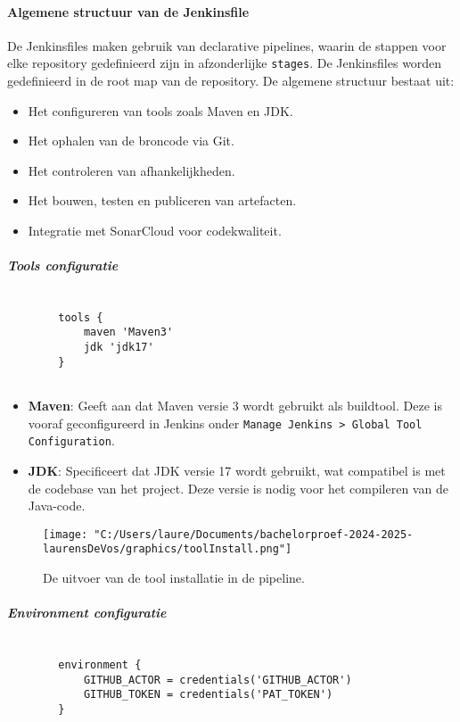 \paragraph{Algemene structuur van de Jenkinsfile}
De Jenkinsfiles maken gebruik van declarative pipelines, waarin de stappen voor elke repository gedefinieerd zijn in afzonderlijke \texttt{stages}. De Jenkinsfiles worden gedefinieerd in de root map van de repository. De algemene structuur bestaat uit:
\begin{itemize}
    \item Het configureren van tools zoals Maven en JDK.
    \item Het ophalen van de broncode via Git.
    \item Het controleren van afhankelijkheden.
    \item Het bouwen, testen en publiceren van artefacten.
    \item Integratie met SonarCloud voor codekwaliteit.
\end{itemize}

\subparagraph{Tools configuratie}
\begin{verbatim}
        
        tools {
            maven 'Maven3'
            jdk 'jdk17'
        }
        

\end{verbatim}

\begin{itemize}
    \item \textbf{Maven}: Geeft aan dat Maven versie 3 wordt gebruikt als buildtool. Deze is vooraf geconfigureerd in Jenkins onder \texttt{Manage Jenkins > Global Tool Configuration}.
    \item \textbf{JDK}: Specificeert dat JDK versie 17 wordt gebruikt, wat compatibel is met de codebase van het project. Deze versie is nodig voor het compileren van de Java-code.
\end{itemize}

\begin{figure}[h!]
    \centering
    \texttt{[image: "C:/Users/laure/Documents/bachelorproef-2024-2025-laurensDeVos/graphics/toolInstall.png"]}
    \caption{De uitvoer van de tool installatie in de pipeline.}
\end{figure}

\subparagraph{Environment configuratie}
\begin{verbatim}
    
        environment {
            GITHUB_ACTOR = credentials('GITHUB_ACTOR')
            GITHUB_TOKEN = credentials('PAT_TOKEN')
        }
  
\end{verbatim}


